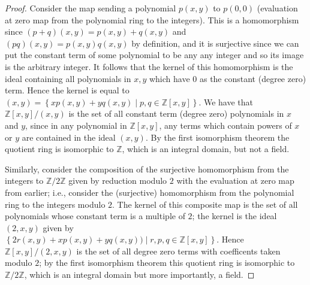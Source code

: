 \documentclass[11pt]{article}
\newcommand{\cbr}[1]{\left\{#1\right\}}
\begin{document}
\begin{enumerate}
\begin{proof}
      Consider the map sending a polynomial $p(x,y)$ to $p(0,0)$ (evaluation at zero map from the polynomial ring to the integers). This is a homomorphism since $(p+q)(x,y) = p(x,y) + q(x,y)$ and $(pq)(x,y) = p(x,y)q(x,y)$ by definition, and it is surjective since we can put the constant term of some polynomial to be any any integer and so its image is the arbitrary integer. It follows that the kernel of this homomorphism is the ideal containing all polynomials in $x,y$ which have $0$ as the constant (degree zero) term. Hence the kernel is equal to $(x,y) = \cbr{xp(x,y) + yq(x,y)\mid p,q\in\mathbb{Z}[x,y]}$. We have that $\mathbb{Z}[x,y]/(x,y)$ is the set of all constant term (degree zero) polynomials in $x$ and $y$, since in any polynomial in $\mathbb{Z}[x,y]$, any terms which contain powers of $x$ or $y$ are contained in the ideal $(x,y)$. By the first isomorphism theorem the quotient ring is isomorphic to $\mathbb{Z}$, which is an integral domain, but not a field. 

      Similarly, consider the composition of the surjective homomorphism from the integers to $\mathbb{Z}/2\mathbb{Z}$ given by reduction modulo $2$ with the evaluation at zero map from earlier; i.e., consider the (surjective) homomorphism from the polynomial ring to the integers modulo $2$. The kernel of this composite map is the set of all polynomials whose constant term is a multiple of $2$; the kernel is the ideal $(2,x,y)$ given by \\$\cbr{2r(x,y)+xp(x,y)+yq(x,y))\mid r,p,q\in\mathbb{Z}[x,y]}$. Hence $\mathbb{Z}[x,y]/(2,x,y)$ is the set of all degree zero terms with coefficents taken modulo $2$; by the first isomorphism theorem this quotient ring is isomorphic to $\mathbb{Z}/2\mathbb{Z}$, which is an integral domain but more importantly, a field.


\end{proof}
\end{enumerate}
\end{document}
